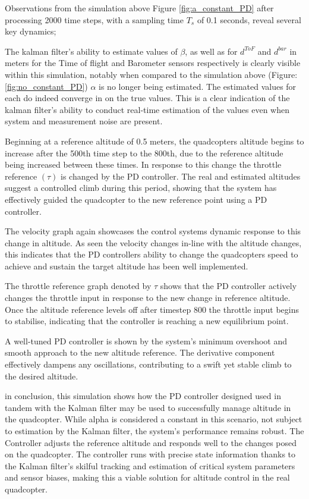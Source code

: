 \documentclass{report}
\begin{document}
Observations from the simulation above Figure \ref{fig:a_constant_PD} after
processing 2000 time steps, with a sampling time \(T_s\) of 0.1 seconds, reveal
several key dynamics;

The kalman filter’s ability to estimate values of \(\beta\), as well as for
\(d^{ToF}\) and \(d^{bar}\) in meters for the Time of flight and Barometer
sensors respectively is clearly visible within this simulation, notably when
compared to the simulation above (Figure:\ref{fig:no_constant_PD}) \(\alpha\) is
no longer being estimated. The estimated values for each do indeed converge in
on the true values. This is a clear indication of the kalman filter’s ability to
conduct real-time estimation of the values even when system and measurement
noise are present.

Beginning at a reference altitude of 0.5 meters, the quadcopters altitude begins
to increase after the 500th time step to the 800th, due to the reference
altitude being increased between these times. In response to this change the
throttle reference \((\tau)\) is changed by the PD controller. The real and
estimated altitudes suggest a controlled climb during this period, showing that
the system has effectively guided the quadcopter to the new reference point
using a PD controller.

The velocity graph again showcases the control systems dynamic response to this
change in altitude. As seen the velocity changes in-line with the altitude
changes, this indicates that the PD controllers ability to change the
quadcopters speed to achieve and sustain the target altitude has been well
implemented.

The throttle reference graph denoted by \(\tau\) shows that the PD controller
actively changes the throttle input in response to the new change in reference
altitude. Once the altitude reference levels off after timestep 800 the throttle
input begins to stabilise, indicating that the controller is reaching a new
equilibrium point.
 
A well-tuned PD controller is shown by the system's minimum overshoot and smooth
approach to the new altitude reference. The derivative component effectively
dampens any oscillations, contributing to a swift yet stable climb to the
desired altitude.

in conclusion, this simulation shows how the PD controller designed used in
tandem with the Kalman filter may be used to successfully manage altitude in the
quadcopter. While alpha is considered a constant in this scenario, not subject
to estimation by the Kalman filter, the system's performance remains robust. The
Controller adjusts the reference altitude and responds well to the changes posed
on the quadcopter. The controller runs with precise state information thanks to
the Kalman filter's skilful tracking and estimation of critical system
parameters and sensor biases, making this a viable solution for altitude control
in the real quadcopter.
\end{document}
